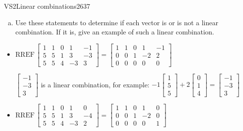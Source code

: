 \begin{exercise}{VS2}{Linear combinations}{2637}
\begin{exerciseStatement}
\begin{enumerate}[(a)]
\begin{itemize}
 
\end{itemize}

     
\item  

 Use these statements to determine if each vector is or is not a linear combination. If it is, give an example of such a linear combination. 

 
\end{enumerate}

     \end{exerciseStatement}
 \begin{exerciseAnswer} 

\begin{itemize}
\item  

 \(
\mathrm{RREF}\, \left[\begin{array}{cccc|c}
1 & 1 & 0 & 1 & -1 \\
5 & 5 & 1 & 3 & -3 \\
5 & 5 & 4 & -3 & 3
\end{array}\right] = \left[\begin{array}{cccc|c}
1 & 1 & 0 & 1 & -1 \\
0 & 0 & 1 & -2 & 2 \\
0 & 0 & 0 & 0 & 0
\end{array}\right]
                        \) 

 

 \(\left[\begin{array}{c}
-1 \\
-3 \\
3
\end{array}\right]\) is a linear combination, for example: \(
-1 \left[\begin{array}{c}
1 \\
5 \\
5
\end{array}\right] + 2 \left[\begin{array}{c}
0 \\
1 \\
4
\end{array}\right] = \left[\begin{array}{c}
-1 \\
-3 \\
3
\end{array}\right]
                            \) 

 
\item  

 \(
\mathrm{RREF}\, \left[\begin{array}{cccc|c}
1 & 1 & 0 & 1 & 0 \\
5 & 5 & 1 & 3 & -4 \\
5 & 5 & 4 & -3 & 2
\end{array}\right] = \left[\begin{array}{cccc|c}
1 & 1 & 0 & 1 & 0 \\
0 & 0 & 1 & -2 & 0 \\
0 & 0 & 0 & 0 & 1
\end{array}\right]
                        \) 


\end{itemize}
\end{exerciseAnswer}
\end{exercise}
